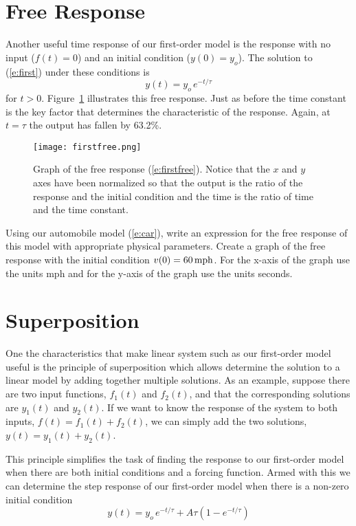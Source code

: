 \section{Free Response}
Another useful time response of our first-order model is the response with no input ($f(t)=0$) and an initial condition ($y(0)=y_o$).  The solution to (\ref{e:first}) under these conditions is 
\begin{equation}\label{e:firstfree}
y(t) = y_o \, e^{-t/\tau}
\end{equation}
for $t>0$. Figure~\ref{f:firstfree} illustrates this free response.  Just as before the time constant is the key factor that determines the characteristic of the response.  Again, at $t=\tau$ the output has fallen by 63.2\%.
\begin{figure}[hbt]
\centering
\texttt{[image: firstfree.png]}
\caption{Graph of the free response (\ref{e:firstfree}).  Notice that the $x$ and $y$ axes have been normalized so that the output is the ratio of the response and the initial condition and the time is the ratio of time and the time constant.}
\label{f:firstfree}
\end{figure}

\begin{ex}
Using our automobile model (\ref{e:car}), write an expression for the free response of this model with appropriate physical parameters.  Create a graph of the free response with the initial condition $v(0)=\unit[60]{mph}$. For the x-axis of the graph use the units mph and for the y-axis of the graph use the units seconds.
\end{ex}

\section{Superposition}
One the characteristics that make linear system such as our first-order model useful is the principle of \gls{superposition} which allows determine the solution to a linear model by adding together multiple solutions.  As an example, suppose there are two input functions, $f_1(t)$ and $f_2(t)$, and that the corresponding solutions are $y_1(t)$ and $y_2(t)$.  If we want to know the response of the system to both inputs, $f(t)=f_1(t)+f_2(t)$, we can simply add the two solutions, $y(t)=y_1(t)+y_2(t)$. 

This principle simplifies the task of finding the response to our first-order model when there are both initial conditions and a forcing function.  Armed with this we can determine the step response of our first-order model when there is a non-zero initial condition
\begin{equation}
y(t) = y_o \, e^{-t/\tau} + A\tau\left(1-e^{-t/\tau}\right)
\end{equation}

